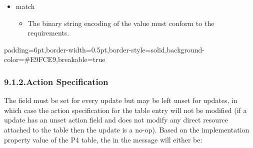 \documentclass[11pt]{article}
\begin{document}
{\begin{itemize}[noitemsep,topsep=\mdcompacttopsep]
\item{} match

\begin{itemize}[noitemsep,topsep=\mdcompacttopsep]%

\item{}The binary string encoding of the value must conform to the
 requirements.%
\end{itemize}%
\end{itemize}%

\begin{mdbmargintb}{6pt}{6pt}%
\begin{mdblock}{padding=6pt,border-width=0.5pt,border-style=solid,background-color=\#E9FCE9,breakable=true}%
\begin{mdpre}%
\end{mdpre}%
\end{mdblock}%
\end{mdbmargintb}%

\subsubsection{9.1.2.\hspace*{0.5em}Action Specification}\label{sec-action-specification}%

\noindent{}The   field must be set for every  update but may be
left unset for  updates, in which case the action specification for the
table entry will not be modified (if a  update has an unset action field
and does not modify any direct resource attached to the table then the 
update is a no-op). Based on the implementation property value of the P4 table,
the  in the  message will either be:%

}
\end{document}
